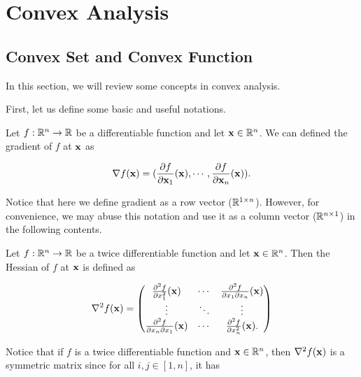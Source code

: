 \documentclass[../main.tex]{subfiles}
\begin{document}
\chapter{Convex Analysis}

\section{Convex Set and Convex Function}
In this section, we will review some concepts in convex analysis.

First, let us define some basic and useful notations.

\begin{definition}
	Let $f: \mathbb{R}^n \to \mathbb{R}$ be a differentiable function and let $\mathbf{x} \in \mathbb{R}^n$. We can defined the gradient of $f$ at $\mathbf{x}$ as 
	
	\begin{equation}
	\nabla f(\mathbf{x}) = (\frac{\partial f}{\partial \mathbf{x}_1} (\mathbf{x}), \cdots, \frac{\partial f}{\partial \mathbf{x}_n} (\mathbf{x})).
	\end{equation}
\end{definition}

\begin{remark}
	Notice that here we define gradient as a row vector ($\mathbb{R}^{1\times n}$). However, for convenience, we may abuse this notation and use it as a column vector ($\mathbb{R}^{n\times 1}$) in the following contents.
\end{remark}
\begin{definition}
	Let $f:\mathbb{R}^n \to \mathbb{R}$ be a twice differentiable function and let $\mathbf{x} \in \mathbb{R}^n$. Then the Hessian of $f$ at $\mathbf{x}$ is defined as
	
	\begin{equation}
	\nabla^2 f(\mathbf{x}) = 
	\begin{pmatrix} 
	\frac{\partial ^2 f}{\partial x_1^2} (\mathbf{x}) & \cdots  & \frac{\partial ^2 f}{\partial x_1 \partial x_n} (\mathbf{x}) \\
	\vdots & \ddots & \vdots \\
	\frac{\partial ^2 f}{\partial x_n \partial x_1} (\mathbf{x}) & \cdots  & \frac{\partial ^2 f}{ \partial x_n^2} (\mathbf{x}).
	\end{pmatrix}
	\end{equation}
	
\end{definition}

Notice that if $f$ is a twice differentiable function and $\mathbf{x} \in \mathbb{R}^n$, then $\nabla^2 f(\mathbf{x})$ is a symmetric matrix since for all $i, j \in [1, n]$, it has
\end{document}
